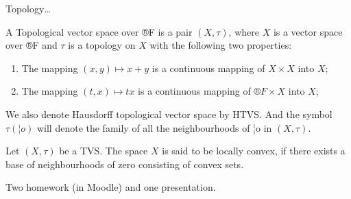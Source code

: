 \documentclass[12pt]{article}					%
\begin{document}

\begin{poznamka}
	Topology…
\end{poznamka}

\begin{definice}
	A Topological vector space over ®F is a pair $(X, τ)$, where $X$ is a vector space over ®F and $τ$ is a topology on $X$ with the following two properties:
	\begin{enumerate}
		\item The mapping $(x, y) \mapsto x + y$ is a continuous mapping of $X \times X$ into $X$;
		\item The mapping $(t, x) \mapsto tx$ is a continuous mapping of $®F \times X$ into $X$;
	\end{enumerate}

	We also denote Hausdorff topological vector space by HTVS. And the symbol $τ(¦o)$ will denote the family of all the neighbourhoods of ¦o in $(X, τ)$.
\end{definice}

\begin{definice}
	Let $(X, τ)$ be a TVS. The space $X$ is said to be locally convex, if there exists a base of neighbourhoods of zero consisting of convex sets.
\end{definice}

\begin{poznamka}
	Two homework (in Moodle) and one presentation.
\end{poznamka}
\end{document}
